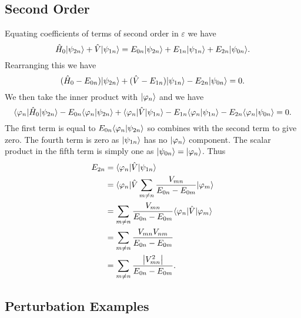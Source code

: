 \subsection{Second Order}
Equating coefficients of terms of second order in \(\varepsilon\) we have
\[\hat{H}_0\vert {\psi_{2n}} \rangle + \hat{V}\vert {\psi_{1n}} \rangle = E_{0n}\vert {\psi_{2n}} \rangle + E_{1n}\vert {\psi_{1n}} \rangle + E_{2n}\vert {\psi_{0n}} \rangle.\]
Rearranging this we have
\[(\hat{H}_0 - E_{0n})\vert {\psi_{2n}} \rangle + (\hat{V} - E_{1n})\vert {\psi_{1n}} \rangle - E_{2n}\vert {\psi_{0n}} \rangle = 0.\]
We then take the inner product with \(\vert {\varphi_n} \rangle\) and we have
\[\langle {\varphi_n} \vert\hat{H}_{0}\vert {\psi_{2n}} \rangle - E_{0n}\langle {\varphi_n} \vert {\psi_{2n}} \rangle + \langle {\varphi_n} \vert\hat{V}\vert {\psi_{1n}} \rangle - E_{1n}\langle {\varphi_n} \vert {\psi_{1n}} \rangle - E_{2n}\langle {\varphi_n} \vert {\psi_{0n}} \rangle = 0.\]
The first term is equal to \(E_{0n}\langle {\varphi_n} \vert {\psi_{2n}} \rangle\) so combines with the second term to give zero.
The fourth term is zero as \(\vert {\psi_{1n}} \rangle\) has no \(\vert {\varphi_n} \rangle\) component.
The scalar product in the fifth term is simply one as \(\vert {\psi_{0n}} \rangle = \vert {\varphi_n} \rangle\).
Thus
\begin{align*}
    E_{2n} &= \langle {\varphi_n} \vert\hat{V}\vert {\psi_{1n}} \rangle\\
    &= \langle {\varphi_n} \vert\hat{V}\sum_{m\ne n} \frac{V_{mn}}{E_{0n} - E_{0m}}\vert {\varphi_m} \rangle\\
    &= \sum_{m\ne n}\frac{V_{mn}}{E_{0n} - E_{0m}}\langle {\varphi_n} \vert \hat{V}\vert {\varphi_m} \rangle\\
    &= \sum_{m\ne n}\frac{V_{mn}V_{nm}}{E_{0n} - E_{0m}}\\
    &= \sum_{m\ne n}\frac{\abs{V_{mn}^2}}{E_{0n} - E_{0m}}.
\end{align*}

\subsection{Perturbation Examples}
